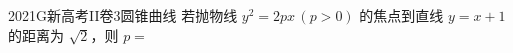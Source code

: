 
\begin{problem}{2021}{G}{新高考II卷}{3}{圆锥曲线}
若抛物线 $ y^{2}=2px\,(p>0) $ 的焦点到直线 $ y=x+1 $ 的距离为 $ \sqrt{2} $，则 $ p= $
\begin{choices}
\end{choices}
\end{problem}

\begin{answer}

\end{answer}

\begin{solutions}

\end{solutions}